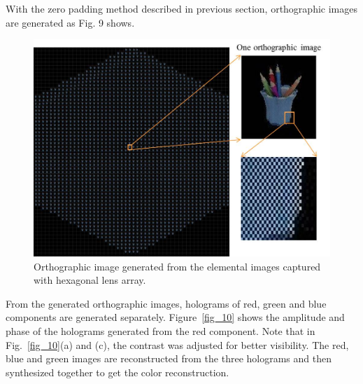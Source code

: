 \documentclass[10pt,letterpaper]{article}
\begin{document}
With the zero padding method described in previous section, orthographic images are generated as Fig. 9 shows. 
\begin{figure}[htb]
\centering\includegraphics[width=.6\columnwidth]{fig_9}
\caption{Orthographic image generated from the elemental images captured with hexagonal lens array. }
\label{fig_9}
\end{figure}

From the generated orthographic images, holograms of red, green and blue components are generated separately. Figure~\ref{fig_10} shows the amplitude and phase of the holograms generated from the red component. Note that in Fig.~\ref{fig_10}(a) and (c), the contrast was adjusted for better visibility. The red, blue and green images are reconstructed from the three holograms and then synthesized together to get the color reconstruction.
\end{document}
